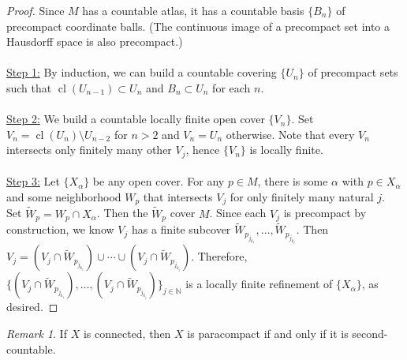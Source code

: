 \documentclass[10pt,letterpaper,cm]{nupset}
\theoremstyle{definition}
\theoremstyle{theorem}
\theoremstyle{remark}
\newtheorem{remark}[definition]{Remark}
\newcommand{\N}{\mathbb N}
\newcommand{\1}{\mathbf{1}}
\newcommand{\0}{\vec 0}
\DeclareMathOperator{\cl}{cl}
\begin{document}
\begin{proof}
Since $M$ has a countable atlas, it has a countable basis $\{B_n\}$ of precompact coordinate balls. (The continuous image of a precompact set into a Hausdorff space is also precompact.)
\\ \\
\underline{Step 1:} By induction, we can build a countable covering $\{U_n\}$ of precompact sets such that $\cl(U_{n-1}) \subset U_n$ and $B_n \subset U_n$ for each $n$.
\\ \\
\underline{Step 2:} We build a countable locally finite open cover $\{V_n\}$. Set $V_n = \cl(U_n) \setminus U_{n-2}$ for $n > 2$ and $V_n = U_n$ otherwise. Note that every $V_n$ intersects only finitely many other $V_j$, hence $\{V_n\}$ is locally finite.
\\ \\
\underline{Step 3:} Let $\{X_\alpha\}$ be any open cover. For any $p \in M$, there is some $\alpha$ with $p\in X_\alpha$ and some neighborhood $W_p$ that intersects $V_j$ for only finitely many natural $j$. Set $\widetilde{W}_p = W_p \cap X_\alpha$. Then the $\widetilde{W}_p$ cover $M$. Since each $V_j$ is precompact by construction, we know $V_j$ has a finite subcover $\widetilde{W}_{p_{j_{k_1}}}, \ldots, \widetilde{W}_{p_{j_{k_j}}}$. Then $V_j = (V_j \cap \widetilde{W}_{p_{j_{k_1}}}) \cup \cdots \cup (V_j \cap \widetilde{W}_{p_{j_{k_j}}})$. Therefore, $\{(V_j \cap \widetilde{W}_{p_{j_{k_1}}}), \ldots, (V_j \cap \widetilde{W}_{p_{j_{k_j}}})\}_{j \in \N}$ is a locally finite refinement of $\{X_\alpha\}$, as desired.
\end{proof}

\begin{remark}
If $X$ is connected, then $X$ is paracompact if and only if it is second-countable.  
\end{remark}
\end{document}
